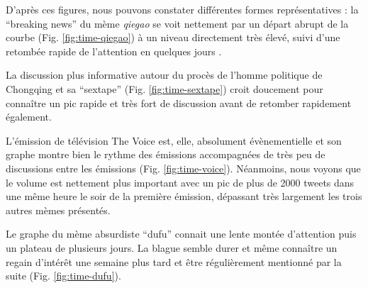 D{\textquoteright}apr\`es ces figures, nous pouvons constater diff\'erentes formes repr\'esentatives : la {\textquotedblleft}breaking news{\textquotedblright} du m\`eme \textit{qiegao} se voit nettement par un d\'epart abrupt de la courbe (Fig. \ref{fig:time-qiegao}) \`a un niveau directement tr\`es \'elev\'e, suivi d{\textquoteright}une retomb\'ee rapide de l{\textquoteright}attention en quelques jours .  

La discussion plus informative autour du proc\`es de l{\textquoteright}homme politique de Chongqing et sa {\textquotedblleft}sextape{\textquotedblright} (Fig. \ref{fig:time-sextape}) croit doucement pour conna\^itre un pic rapide et tr\`es fort de discussion avant de retomber rapidement \'egalement.  

L{\textquoteright}\'emission de t\'el\'evision The Voice est, elle, absolument \'ev\`enementielle et son graphe montre bien le rythme des \'emissions accompagn\'ees de tr\`es peu de discussions entre les \'emissions (Fig. \ref{fig:time-voice}). N\'eanmoins, nous voyons que le volume est nettement plus important avec un pic de plus de 2000 tweets dans une m\^eme heure le soir de la premi\`ere \'emission, d\'epassant tr\`es largement les trois autres m\`emes pr\'esent\'es.  

Le graphe du m\`eme absurdiste {\textquotedblleft}dufu{\textquotedblright} connait une lente mont\'ee d{\textquoteright}attention puis un plateau de plusieurs jours. La blague semble durer et m\^eme conna\^itre un regain d{\textquoteright}int\'er\^et une semaine plus tard et \^etre r\'eguli\`erement mentionn\'e par la suite (Fig. \ref{fig:time-dufu}).

